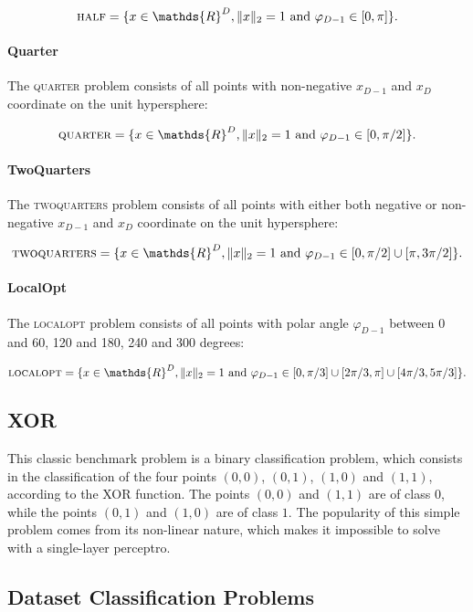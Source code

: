 \[
    \textsc{half} = \{x \in \mathds{R}^D, \lVert x \rVert_2 = 1 \text{ and } \varphi_{D-1} \in [0, \pi]\}.
\]

\paragraph{Quarter}
The \textsc{quarter} problem consists of all points with non-negative $x_{D-1}$ and $x_D$ coordinate on the unit hypersphere:

\[
    \textsc{quarter} = \{x \in \mathds{R}^D, \lVert x \rVert_2 = 1 \text{ and } \varphi_{D-1} \in [0, \pi / 2]\}.
\]

\paragraph{TwoQuarters}
The \textsc{twoquarters} problem consists of all points with either both negative or non-negative $x_{D-1}$ and $x_D$ coordinate on the unit hypersphere:

\[
    \textsc{twoquarters} = \{x \in \mathds{R}^D, \lVert x \rVert_2 = 1 \text{ and } \varphi_{D-1} \in [0, \pi / 2] \cup [\pi, 3\pi / 2]\}.
\]

\paragraph{LocalOpt}
The \textsc{localopt} problem consists of all points with polar angle $\varphi_{D-1}$ between 0 and 60, 120 and 180, 240 and 300 degrees:

\[
    \textsc{localopt} = \{x \in \mathds{R}^D, \lVert x \rVert_2 = 1 \text{ and } \varphi_{D-1} \in [0, \pi / 3] \cup [2\pi / 3, \pi] \cup [4\pi / 3, 5\pi / 3]\}.
\]


\subsection{XOR}

This classic benchmark problem is a binary classification problem, which consists in the classification of the four points $(0, 0)$, $(0, 1)$, $(1, 0)$ and $(1, 1)$, according to the XOR function.
The points $(0, 0)$ and $(1, 1)$ are of class $0$, while the points $(0, 1)$ and $(1, 0)$ are of class $1$.
The popularity of this simple problem comes from its non-linear nature, which makes it impossible to solve with a single-layer perceptro.

\subsection{Dataset Classification Problems}

